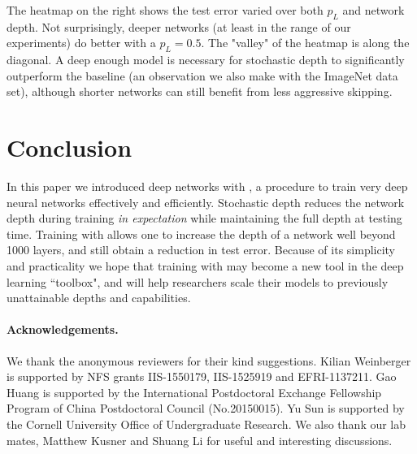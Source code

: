 \documentclass[runningheads]{llncs}
\begin{document}
The heatmap on the right shows the test error varied over both $p_L$ and network depth. Not surprisingly, deeper networks (at least in the range of our experiments) do better with a $p_L=0.5$. The "valley" of the heatmap is along the diagonal. A deep enough model is necessary for stochastic depth to significantly outperform the baseline (an observation we also make with the ImageNet data set), although shorter networks can still benefit from less aggressive skipping.
 


\section{Conclusion}

\label{sec_conclusion}

In this paper we introduced deep networks with \emph{\name{}}, a procedure to train very deep neural networks effectively and efficiently. Stochastic depth reduces the network depth during training \emph{in expectation} while maintaining the full depth at testing time. Training with \name{} allows one to increase the depth of a network well beyond 1000 layers, and still obtain a reduction in test error. Because of its simplicity and practicality we hope that training with \name{} may become a new tool in the deep learning ``toolbox", and will help researchers scale their models to previously unattainable depths and capabilities.

\paragraph{\textbf{Acknowledgements.}} We thank the anonymous reviewers for their kind suggestions. Kilian Weinberger is supported by NFS grants IIS-1550179, IIS-1525919 and EFRI-1137211. Gao Huang is supported by the International Postdoctoral Exchange Fellowship Program of China Postdoctoral Council (No.20150015). Yu Sun is supported by the Cornell University Office of Undergraduate Research. We also thank our lab mates, Matthew Kusner and Shuang Li for useful and interesting discussions. 





\end{document}
